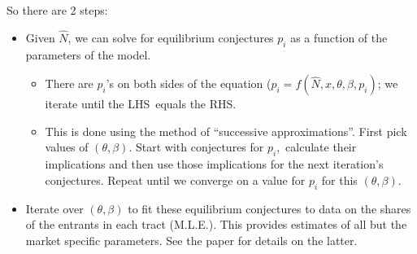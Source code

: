 \begin{frame}%


So there are 2 steps:

\begin{itemize}
\item Given $\hat{N}$, we can solve for equilibrium conjectures $p_{i}$ as a
function of the parameters of the model.

\begin{itemize}
\item There are $p_{i}$'s on both sides of the equation ($p_{i}=f(\hat{N}%
,x,\theta ,\beta ,p_{i})$; we iterate until the LHS\ equals the RHS.

\item This is done using the method of \textquotedblleft successive
approximations\textquotedblright . First pick values of $(\theta ,\beta )$.
Start with conjectures for $p_{i},$ calculate their implications and then
use those implications for the next iteration's conjectures. Repeat until we
converge on a value for $p_{i}$ for this $(\theta ,\beta ).$
\end{itemize}

\item Iterate over $(\theta ,\beta )$ to fit these equilibrium conjectures
to data on the shares of the entrants in each tract (M.L.E.). This provides
estimates of all but the market specific parameters. See the paper for
details on the latter.
\end{itemize}

\end{frame}%

